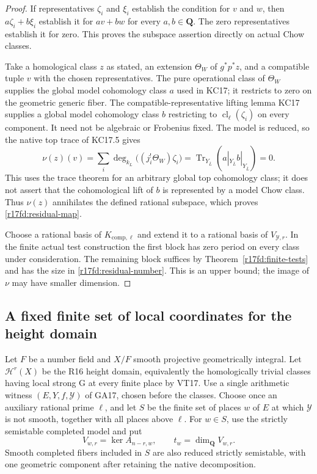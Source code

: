 \begin{proof}
If representatives $\zeta_i$ and $\xi_i$ establish the
condition for $v$ and $w$, then $a\zeta_i+b\xi_i$ establish
it for $av+bw$ for every $a,b\in\mathbf Q$. The zero
representatives establish it for zero. This proves the
subspace assertion directly on actual Chow classes.

Take a homological class $z$ as stated, an extension
$\Theta_W$ of $g^*p^*z$, and a compatible tuple $v$ with
the chosen representatives. The pure operational class of
$\Theta_W$ supplies the global model cohomology class $a$
used in KC17; it restricts to zero on the geometric generic
fiber. The compatible-representative lifting lemma KC17
supplies a global model cohomology class $b$ restricting to
$\operatorname{cl}_\ell(\zeta_i)$ on every component.
It need not be algebraic or Frobenius fixed. The model is
reduced, so the native top trace of KC17.5 gives
\[
 \nu(z)(v)
       =\sum_i\deg_{k_L}\bigl((j_i^!\Theta_W)\zeta_i\bigr)
       =\operatorname{Tr}_{Y_{\bar L}}
                      (a|_{Y_{\bar L}}b|_{Y_{\bar L}})=0.
\]
This uses the trace theorem for an arbitrary global top
cohomology class; it does not assert that the cohomological
lift of $b$ is represented by a model Chow class.
Thus $\nu(z)$ annihilates the defined rational subspace,
which proves \eqref{r17fd:residual-map}.

Choose a rational basis of $K_{\mathrm{comp},\ell}$ and
extend it to a rational basis of $V_{\mathcal Y,r}$. In the
finite actual test construction the first block has zero
period on every class under consideration. The remaining
block suffices by Theorem~\ref{r17fd:finite-tests} and has
the size in \eqref{r17fd:residual-number}. This is an upper
bound; the image of $\nu$ may have smaller dimension.
\end{proof}

\subsection{A fixed finite set of local coordinates for the height domain}

Let $F$ be a number field and $X/F$ smooth projective
geometrically integral. Let $\mathcal H^r(X)$ be the R16
height domain, equivalently the homologically trivial classes
having local strong G at every finite place by VT17.
Use a single arithmetic witness $(E,Y,f,\mathcal Y)$ of
GA17, chosen before the classes. Choose once an auxiliary
rational prime $\ell$, and let $S$ be the finite set of
places $w$ of $E$ at which $\mathcal Y$ is not smooth,
together with all places above $\ell$.
For $w\in S$, use the strictly semistable completed model
and put
\[
        V_{w,r}=\ker A_{n-r,w},\qquad
        t_w=\dim_{\mathbf Q}V_{w,r}.
\]
Smooth completed fibers included in $S$ are also reduced
strictly semistable, with one geometric component after
retaining the native decomposition.

